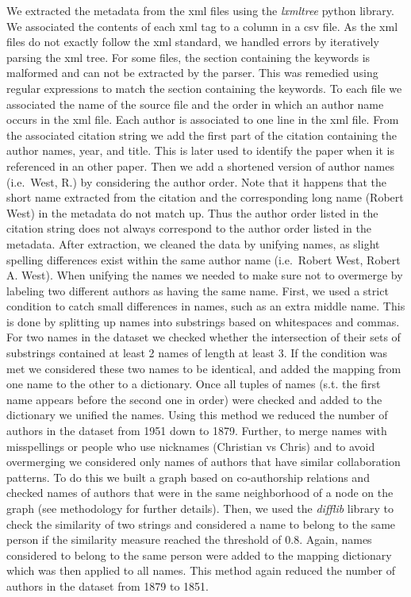 \documentclass[article,twocolumn]{IEEEtran}
\begin{document}
We extracted the metadata from the xml files using the \emph{lxmltree}
python library. We associated the contents of each xml tag to a column
in a csv file. As the xml files do not exactly follow the xml standard,
we handled errors by iteratively parsing the xml tree. For some files,
the section containing the keywords is malformed and can not be
extracted by the parser. This was remedied using regular expressions to
match the section containing the keywords. To each file we associated
the name of the source file and the order in which an author name occurs
in the xml file. Each author is associated to one line in the xml file.
From the associated citation string we add the first part of the
citation containing the author names, year, and title. This is later
used to identify the paper when it is referenced in an other paper. Then
we add a shortened version of author names (i.e.~West, R.) by
considering the author order. Note that it happens that the short name
extracted from the citation and the corresponding long name (Robert
West) in the metadata do not match up. Thus the author order listed in
the citation string does not always correspond to the author order
listed in the metadata. After extraction, we cleaned the data by
unifying names, as slight spelling differences exist within the same
author name (i.e.~Robert West, Robert A. West). When unifying the names
we needed to make sure not to overmerge by labeling two different
authors as having the same name. First, we used a strict condition to
catch small differences in names, such as an extra middle name. This is
done by splitting up names into substrings based on whitespaces and
commas. For two names in the dataset we checked whether the intersection
of their sets of substrings contained at least 2 names of length at
least 3. If the condition was met we considered these two names to be
identical, and added the mapping from one name to the other to a
dictionary. Once all tuples of names (s.t. the first name appears before
the second one in order) were checked and added to the dictionary we
unified the names. Using this method we reduced the number of authors in
the dataset from 1951 down to 1879. Further, to merge names with
misspellings or people who use nicknames (Christian vs Chris) and to
avoid overmerging we considered only names of authors that have similar
collaboration patterns. To do this we built a graph based on
co-authorship relations and checked names of authors that were in the
same neighborhood of a node on the graph (see methodology for further
details). Then, we used the \emph{difflib} library to check the
similarity of two strings and considered a name to belong to the same
person if the similarity measure reached the threshold of 0.8. Again,
names considered to belong to the same person were added to the mapping
dictionary which was then applied to all names. This method again
reduced the number of authors in the dataset from 1879 to 1851.
\end{document}
